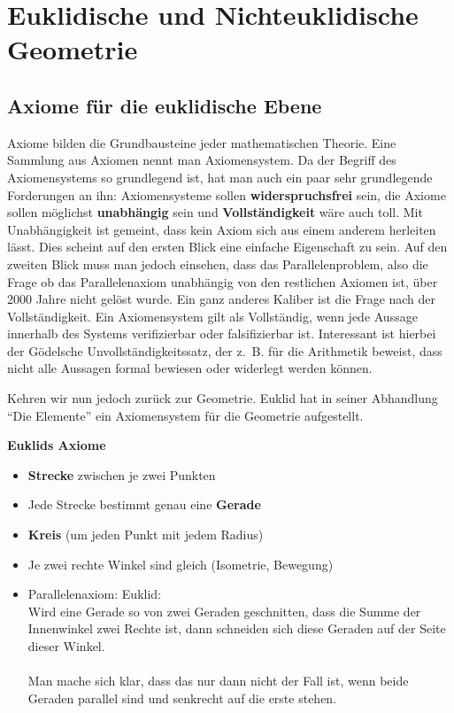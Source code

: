 \chapter{Euklidische und Nichteuklidische Geometrie}
\section{Axiome für die euklidische Ebene}
Axiome bilden die Grundbausteine jeder mathematischen Theorie. Eine
Sammlung aus Axiomen nennt man Axiomensystem.
Da der Begriff des Axiomensystems so grundlegend ist, hat man auch 
ein paar sehr grundlegende Forderungen an ihn: Axiomensysteme sollen
\textbf{widerspruchsfrei} sein, die Axiome sollen möglichst
\textbf{unabhängig} sein und \textbf{Vollständigkeit} wäre auch toll.
Mit Unabhängigkeit ist gemeint, dass kein Axiom sich aus einem anderem
herleiten lässt. Dies scheint auf den ersten Blick eine einfache
Eigenschaft zu sein. Auf den zweiten Blick muss man jedoch einsehen, 
dass das Parallelenproblem, also die Frage ob das Parallelenaxiom 
unabhängig von den restlichen Axiomen ist, über 2000 Jahre nicht 
gelöst wurde. Ein ganz anderes Kaliber ist die Frage nach der
Vollständigkeit. Ein Axiomensystem gilt als Vollständig, wenn
jede Aussage innerhalb des Systems verifizierbar oder falsifizierbar
ist. Interessant ist hierbei der Gödelsche Unvollständigkeitssatz, 
der z.~B. für die Arithmetik beweist, dass nicht alle Aussagen
formal bewiesen oder widerlegt werden können.

Kehren wir nun jedoch zurück zur Geometrie. Euklid hat in seiner 
Abhandlung \enquote{Die Elemente} ein Axiomensystem für die Geometrie
aufgestellt. 

\textbf{Euklids Axiome}
\begin{itemize}
    \item \textbf{Strecke} zwischen je zwei Punkten
    \item Jede Strecke bestimmt genau eine \textbf{Gerade}
    \item \textbf{Kreis} (um jeden Punkt mit jedem Radius)
    \item Je zwei rechte Winkel sind gleich (Isometrie, Bewegung)
    \item Parallelenaxiom: Euklid:\\
        Wird eine Gerade so von zwei Geraden geschnitten, dass die 
        Summe der Innenwinkel zwei Rechte ist, dann schneiden sich
        diese Geraden auf der Seite dieser Winkel.\\
        \\
        Man mache sich klar, dass das nur dann nicht der Fall ist, 
        wenn beide Geraden parallel sind und senkrecht auf die erste stehen.
\end{itemize}

